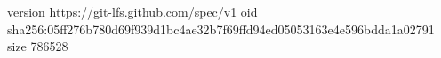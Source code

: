 version https://git-lfs.github.com/spec/v1
oid sha256:05ff276b780d69f939d1bc4ae32b7f69ffd94ed05053163e4e596bdda1a02791
size 786528
